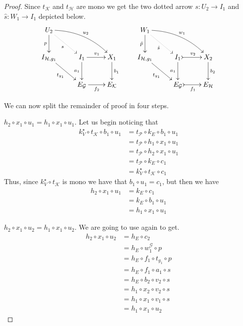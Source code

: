\documentclass[runningheads,envcountsect]{llncs}
\begin{document}
\begin{proof}
Since $t_{\mathcal{K}}$ and $t_\mathcal{H}$ are mono we get the two dotted arrow $s\colon U_2\to I_1$ and $\hat{s}\colon W_1\to I_1$ depicted below.
\[\xymatrix{U_2 \ar@/^.4cm/[drr]^{u_2}  \ar[d]_{p}\ar@{.>}[dr]_{s} & &&W_1 \ar@/^.4cm/[drr]^{w_1}  \ar[d]_{\hat{p}}\ar@{.>}[dr]_{\hat{s}}\\ I_{\mathcal{H}, g_1} \ar[dr]_{t_{g_1}}& I_1 \ar[r]^{v_1} \ar[d]_{a_1} & X_1 \ar[d]^{b_1} & I_{\mathcal{H}, g_1} \ar[dr]_{t_{g_1}}& I_1 \ar@{>->}[r]^{v_2} \ar[d]_{a_1} & X_2 \ar[d]^{b_2}\\ & E_{\mathcal{G}} \ar[r]_{f_2} & E_{\mathcal{K}}& & E_{\mathcal{G}} \ar@{>->}[r]_{f_1} & E_{\mathcal{H}}}\]

 We can now split the remainder of proof in four steps.

\smallskip \noindent 
$	h_2\circ x_1\circ u_1=h_1\circ x_1\circ u_1$. Let us begin noticing that
	\begin{align*}
		k^\star_{V} \circ t_{\mathcal{K}} \circ b_1 \circ u_1& = t_{\mathcal{P}}\circ k_E \circ b_1 \circ u_1\\&=t_{\mathcal{P}}\circ h_1\circ x_1 \circ u_1\\&=t_{\mathcal{P}}\circ h_2\circ x_1 \circ u_1\\&=t_{\mathcal{P}}\circ k_E\circ c_1\\&=k^\star_V\circ t_{\mathcal{K}} \circ c_1
	\end{align*}
	Thus, since $k^\star_{V}\circ t_{\mathcal{{K}}}$ is mono we have that $b_1\circ u_1 = c_1$, but then we have
	\begin{align*}
		h_2\circ x_1\circ u_1&=k_E\circ c_1\\&= k_E\circ b_1\circ u_1\\&=h_1\circ x_1\circ u_1
	\end{align*}

\smallskip \noindent  $	h_2\circ x_1\circ u_2=h_1\circ x_1\circ u_2$. We are going to use again  to get.
	\begin{align*}
		h_2\circ x_1\circ u_2&=h_E\circ c_2\\&=h_E\circ w^{\mathcal{G}}_1\circ p\\&=h_E\circ f_1\circ t_{g_1}\circ p\\&=h_E\circ f_1\circ a_1\circ s\\&=h_E\circ b_2\circ v_2\circ s\\&=h_1\circ x_2\circ v_2\circ s\\&=h_1\circ x_1\circ v_1\circ s\\&=	h_1\circ x_1\circ u_2
	\end{align*}
	

\end{proof}
\end{document}
